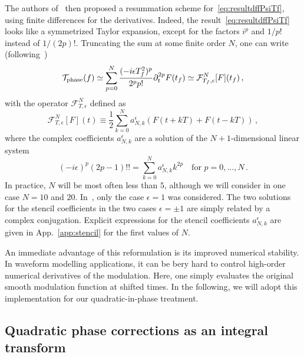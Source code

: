 \documentclass[aps,showpacs,twocolumn,
prd,superscriptaddress,nofootinbib]{revtex4-1}
\newcommand{\be}{\begin{equation}}
\newcommand{\ee}{\end{equation}}
\newcommand\calF{{\mathcal{F}}}
\newcommand\calT{{\mathcal{T}}}
\newcommand{\tf}{t_{f}}
\newcommand{\Tf}{T_{f}}
\begin{document}
The authors of~\cite{KCY14} then proposed a resummation scheme for~\eqref{eq:resultdffPsiTf}, using finite differences for the derivatives. Indeed, the result~\eqref{eq:resultdffPsiTf} looks like a symmetrized Taylor expansion, except for the factors $i^{p}$ and $1/p!$ instead of $1/(2p)!$. Truncating the sum at some finite order $N$, one can write (following~\cite{KCY14})
\be\label{eq:stencilresult}
	\calT_{\rm phase}(f) \simeq \sum\limits_{p = 0}^{N} \frac{(-i\epsilon\Tf^{2})^{p}}{2^{p}p!} \partial_{t}^{2p}F(\tf) \simeq \calF^{N}_{\Tf, \epsilon}[F] (\tf) \,,
\ee
with the operator $\calF_{T, \epsilon}^{N}$ defined as
\be\label{eq:stencilfresnel}
	\calF_{T, \epsilon}^{N}[F] (t) \equiv \frac{1}{2}\sum\limits_{k=0}^{N} a_{N,k}^{\epsilon} \left( F(t + kT) + F(t - k T) \right) \,,
\ee
where the complex coefficients $a_{N,k}^{\epsilon}$ are a solution of the $N+1$-dimensional linear system~\cite{KCY14}
\be\label{eq:stencilsystem}
	(-i\epsilon)^{p} (2p-1)!! = \sum\limits_{k=0}^{N} a_{N,k}^{\epsilon} k^{2p} \quad \text{for } p=0,\dots,N \,.
\ee
In practice, $N$ will be most often less than $5$, although we will consider in one case $N=10$ and $20$. In~\cite{KCY14}, only the case $\epsilon=1$ was considered. The two solutions for the stencil coefficients in the two cases $\epsilon = \pm 1$ are simply related by a complex conjugation. Explicit expressions for the stencil coefficients $a_{N,k}^{\epsilon}$ are given in App.~\ref{app:stencil} for the first values of $N$.

An immediate advantage of this reformulation is its improved numerical stability. In waveform modelling applications, it can be bery hard to control high-order numerical derivatives of the modulation. Here, one simply evaluates the original smooth modulation function at shifted times. In the following, we will adopt this implementation for our quadratic-in-phase treatment.


\subsection{Quadratic phase corrections as an integral transform}
\label{subsec:fresneltransform}
\end{document}
